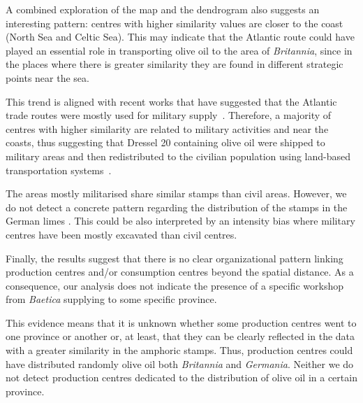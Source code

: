 \documentclass[review]{elsarticle}
\newcommand{\memo}[2]{\textcolor{#1}{#2}}
\newcommand{\xavi}[1]{\memo{magenta}{XRC: #1\\}}
\begin{document}
A combined exploration of the map and the dendrogram also suggests an interesting pattern: centres with higher similarity values are closer to the coast (North Sea and Celtic Sea). This may indicate that the Atlantic route could have played an essential role in transporting olive oil to the area of \textit{Britannia}, since in the places where there is greater similarity they are found in different strategic points near the sea.

This trend is aligned with recent works that have suggested that the Atlantic trade routes were mostly used for military supply~\citep{remesal_annona_1986,remesal_provincial_2008,carreras_atlantic_2012,morillo_hispania_2016,rubio-campillo_provincias_2018}. Therefore, a majority of centres with higher similarity are related to military activities and near the coasts, thus suggesting that Dressel 20 containing olive oil were shipped to military areas and then redistributed to the civilian population using land-based transportation systems~\citep{carreras_britannia_1998,ayllon_olive_2018}.


The areas mostly militarised share similar stamps than civil areas. However, we do not detect a concrete pattern regarding the distribution of the stamps in the German limes \citep{xanten2018}. This could be also interpreted by an intensity bias where military centres have been mostly excavated than civil centres.




Finally, the results suggest that there is no clear organizational pattern linking production centres and/or consumption centres beyond the spatial distance. As a consequence, our analysis does not indicate the presence of a specific workshop from \textit{Baetica} supplying to some specific province. 

This evidence means that it is unknown whether some production centres went to one province or another or, at least, that they can be clearly reflected in the data with a greater similarity in the amphoric stamps. Thus, production centres could have distributed randomly olive oil both \textit{Britannia} and \textit{Germania}. Neither we do not detect production centres dedicated to the distribution of olive oil in a certain province. 
\end{document}
